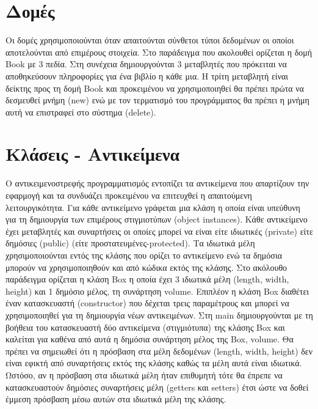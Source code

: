 



\section{Δομές}
Οι δομές χρησιμοποιούνται όταν απαιτούνται σύνθετοι τύποι δεδομένων οι οποίοι αποτελούνται από επιμέρους στοιχεία. Στο παράδειγμα που ακολουθεί ορίζεται η δομή Book με 3 πεδία. Στη συνέχεια δημιουργούνται 3 μεταβλητές που πρόκειται να αποθηκεύσουν πληροφορίες για ένα βιβλίο η κάθε μια.  Η τρίτη μεταβλητή είναι δείκτης προς τη δομή Book και προκειμένου να χρησιμοποιηθεί θα πρέπει πρώτα να δεσμευθεί μνήμη (new) ενώ με τον τερματισμό του προγράμματος θα πρέπει η μνήμη αυτή να επιστραφεί στο σύστημα (delete).





\section{Κλάσεις - Αντικείμενα}
Ο αντικειμενοστρεφής προγραμματισμός εντοπίζει τα αντικείμενα που απαρτίζουν την εφαρμογή και τα συνδυάζει προκειμένου να επιτευχθεί η απαιτούμενη λειτουργικότητα. Για κάθε αντικείμενο γράφεται μια κλάση η οποία είναι υπεύθυνη για τη δημιουργία των επιμέρους στιγμιοτύπων (object instances). Κάθε αντικείμενο έχει μεταβλητές και συναρτήσεις οι οποίες μπορεί να είναι είτε ιδιωτικές (private) είτε δημόσιες (public) (είτε προστατευμένες-protected).  Τα ιδιωτικά μέλη χρησιμοποιούνται εντός της κλάσης που ορίζει το αντικείμενο ενώ τα δημόσια μπορούν να χρησιμοποιηθούν και από κώδικα εκτός της κλάσης. Στο ακόλουθο παράδειγμα ορίζεται η κλάση Box η οποία έχει 3 ιδιωτικά μέλη (length, width, height) και 1 δημόσιο μέλος,  τη συνάρτηση volume. Επιπλέον η κλάση Box διαθέτει έναν κατασκευαστή (constructor) που δέχεται τρεις παραμέτρους και μπορεί να χρησιμοποιηθεί για τη δημιουργία νέων αντικειμένων. Στη main δημιουργούνται με τη βοήθεια του κατασκευαστή δύο αντικείμενα (στιγμιότυπα) της κλάσης Box και καλείται για καθένα από αυτά η δημόσια συνάρτηση μέλος της Box, volume. Θα πρέπει να σημειωθεί ότι η πρόσβαση στα μέλη δεδομένων (length, width, height) δεν είναι εφικτή από συναρτήσεις εκτός της κλάσης καθώς τα μέλη αυτά είναι ιδιωτικά. Ωστόσο, αν η πρόσβαση στα ιδιωτικά μέλη ήταν επιθυμητή τότε θα έπρεπε να κατασκευαστούν δημόσιες συναρτήσεις μέλη (getters και setters) έτσι ώστε να δοθεί έμμεση πρόσβαση μέσω αυτών στα ιδιωτικά μέλη της κλάσης.

